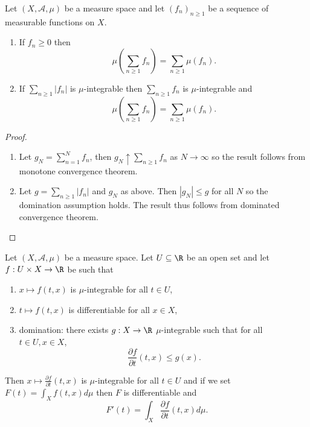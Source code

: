 \documentclass[a4paper]{article}
\begin{document}
\begin{corollary}
  Let \((X, \mathcal A, \mu)\) be a measure space and let \((f_n)_{n \geq 1}\) be a sequence of measurable functions on \(X\).
  \begin{enumerate}
  \item If \(f_n \geq 0\) then
    \[
      \mu(\sum_{n \geq 1} f_n) = \sum_{n \geq 1} \mu(f_n).
    \]
  \item If \(\sum_{n \geq 1} |f_n|\) is \(\mu\)-integrable then \(\sum_{n \geq 1} f_n\) is \(\mu\)-integrable and
    \[
      \mu(\sum_{n \geq 1} f_n) = \sum_{n \geq 1} \mu(f_n).
    \]
  \end{enumerate}
\end{corollary}

\begin{proof}\leavevmode
  \begin{enumerate}
  \item Let \(g_N = \sum_{n = 1}^N f_n\), then \(g_N \uparrow \sum_{n \geq 1} f_n\) as \(N \to \infty\) so the result follows from monotone convergence theorem.
  \item Let \(g = \sum_{n \geq 1} |f_n|\) and \(g_N\) as above. Then \(|g_N| \leq g\) for all \(N\) so the domination assumption holds. The result thus follows from dominated convergence theorem.
  \end{enumerate}
\end{proof}

\begin{corollary}
  Let \((X, \mathcal A, \mu)\) be a measure space. Let \(U \subseteq \R\) be an open set and let \(f: U \times X \to \R\) be such that
  \begin{enumerate}
  \item \(x \mapsto f(t, x)\) is \(\mu\)-integrable for all \(t \in U\),
  \item \(t \mapsto f(t, x)\) is differentiable for all \(x \in X\),
  \item domination: there exists \(g: X \to \R\) \(\mu\)-integrable such that for all \(t \in U, x \in X\),
    \[
      \frac{\partial f}{\partial t} (t, x) \leq g(x).
    \]
  \end{enumerate}
  Then \(x \mapsto \frac{\partial f}{\partial t}(t, x)\) is \(\mu\)-integrable for all \(t \in U\) and if we set \(F(t) = \int_X f(t, x) d\mu\) then \(F\) is differentiable and 
  \[
    F'(t) = \int_X \frac{\partial f}{\partial t}(t, x) d\mu.
  \]
\end{corollary}
\end{document}
